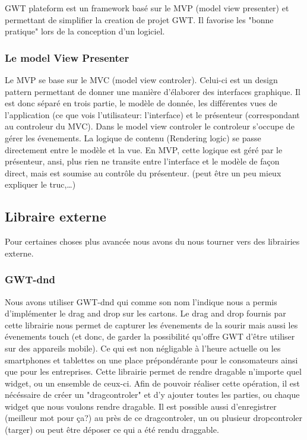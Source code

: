 GWT plateform est un framework basé sur le MVP (model view presenter) et permettant de simplifier la creation de projet GWT. Il favorise les "bonne pratique" lors de la conception d'un logiciel.
	
\subsubsection{Le model View Presenter}
Le MVP se base sur le MVC (model view controler). Celui-ci est un design pattern permettant de donner une manière d'élaborer des interfaces graphique. Il est donc séparé en trois partie, le modèle de donnée, les différentes vues de l'application (ce que vois l'utilisateur: l'interface) et le présenteur (correspondant au controleur du MVC). Dans le model view controler le controleur s'occupe de gérer les évenements. La logique de contenu (Rendering logic) se passe directement entre le modèle et la vue. En MVP, cette logique est géré par le présenteur, ansi, plus rien ne transite entre l'interface et le modèle de façon direct, mais est soumise au contrôle du présenteur. (peut être un peu mieux expliquer le truc,…)

\subsection{Libraire externe}
Pour certaines choses plus avancée nous avons du nous tourner vers des librairies externe. 
\subsubsection{GWT-dnd}
Nous avons utiliser GWT-dnd qui comme son nom l'indique nous a permis
d'implémenter le drag and drop sur les cartons. Le drag and drop fournis par
cette librairie nous permet de capturer les évenements de la sourir mais aussi les évenements touch (et donc, de garder la possibilité qu'offre GWT d'être utiliser sur des appareils mobile). Ce qui est non négligable à l'heure actuelle ou les smartphones et tablettes on une place prépondérante pour le consomateurs ainsi que pour les entreprises. Cette librairie permet de rendre dragable n'importe quel widget, ou un ensemble de ceux-ci. Afin de pouvoir réaliser cette opération, il est nécéssaire de créer un "dragcontroler" et d'y ajouter toutes les parties, ou chaque widget que nous voulons rendre dragable. Il est possible aussi d'enregistrer (meilleur mot pour ça?) au près de ce dragcontroler, un ou plusieur dropcontroler (targer) ou peut être déposer ce qui a été rendu draggable.

